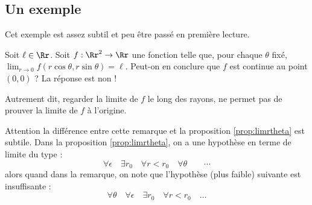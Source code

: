 \documentclass[12pt, class=report,crop=false]{standalone}
\begin{document}
\subsection{Un exemple}

Cet exemple est assez subtil et peu être passé en première lecture.

\begin{remarque*}
Soit $\ell \in \Rr$. Soit $f: \Rr^2 \rightarrow \Rr$ une fonction telle que, pour chaque $\theta$ fixé, $\displaystyle \lim_{r \to0} f(r\cos\theta, r\sin\theta)=\ell$. Peut-on en conclure que $f$ est continue au point $(0,0)$ ? La réponse est non !

Autrement dit, regarder la limite de $f$ le long des rayons, ne permet pas de prouver la limite de $f$ à l'origine.
\end{remarque*}

Attention la différence entre cette remarque et la proposition \ref{prop:limrtheta} est subtile. Dans la proposition \ref{prop:limrtheta}, on a une hypothèse en terme de limite du type :
$$\forall \epsilon \quad \exists r_0 \quad \forall r<r_0 \quad \forall \theta \quad  \quad \cdots$$
alors quand dans la remarque, on note que l'hypothèse (plus faible) suivante est insuffisante :
$$ \forall \theta \quad \forall \epsilon \quad \exists r_0 \quad \forall r<r_0 \quad \ldots$$
\end{document}
